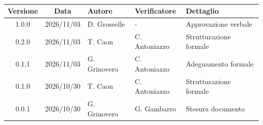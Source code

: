 \\[0.5cm]
\renewcommand{\arraystretch}{1.3}
\noindent
\begin{tabularx}{\textwidth}{|c|c|>{\raggedright\arraybackslash}p{2.5cm}|>{\raggedright\arraybackslash}p{2.5cm}|X|}
    \hline
    \textbf{Versione} & \textbf{Data} & \textbf{Autore} & \textbf{Verificatore} & \textbf{Dettaglio} \\
    \hline
    1.0.0 & 2026/11/03 & D. Grosselle & - & Approvazione verbale \\
    \hline
    0.2.0 & 2026/11/03 & T. Caon & C. Antoniazzo & Strutturazione formale \\
    \hline
    0.1.1 & 2026/11/03 & G. Grinovero & C. Antoniazzo & Adeguamento formale \\
    \hline
    0.1.0 & 2026/10/30 & T. Caon & C. Antoniazzo & Strutturazione formale \\
    \hline
    0.0.1 & 2026/10/30 & G. Grinovero & G. Gambarro & Stesura documento \\
    \hline
\end{tabularx}
\newpage
